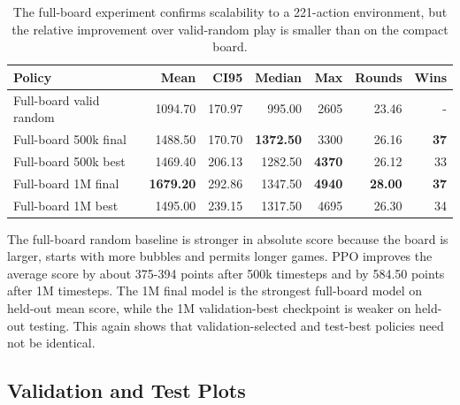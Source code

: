 \documentclass[10pt,a4paper]{article}
\begin{document}
\begin{table}[H]
\centering
\caption{The full-board experiment confirms scalability to a 221-action environment, but the relative improvement over valid-random play is smaller than on the compact board.}
\label{tab:full-results}
\small
\begin{tabular}{lrrrrrr}
\toprule
Policy & Mean & CI95 & Median & Max & Rounds & Wins \\
\midrule
Full-board valid random & 1094.70 & 170.97 & 995.00 & 2605 & 23.46 & - \\
Full-board 500k final & 1488.50 & 170.70 & \textbf{1372.50} & 3300 & 26.16 & \textbf{37} \\
Full-board 500k best & 1469.40 & 206.13 & 1282.50 & \textbf{4370} & 26.12 & 33 \\
Full-board 1M final & \textbf{1679.20} & 292.86 & 1347.50 & \textbf{4940} & \textbf{28.00} & \textbf{37} \\
Full-board 1M best & 1495.00 & 239.15 & 1317.50 & 4695 & 26.30 & 34 \\
\bottomrule
\end{tabular}
\end{table}

The full-board random baseline is stronger in absolute score because the board is larger, starts with more bubbles and permits longer games. PPO improves the average score by about 375-394 points after 500k timesteps and by 584.50 points after 1M timesteps. The 1M final model is the strongest full-board model on held-out mean score, while the 1M validation-best checkpoint is weaker on held-out testing. This again shows that validation-selected and test-best policies need not be identical.

\subsection{Validation and Test Plots}
\end{document}
